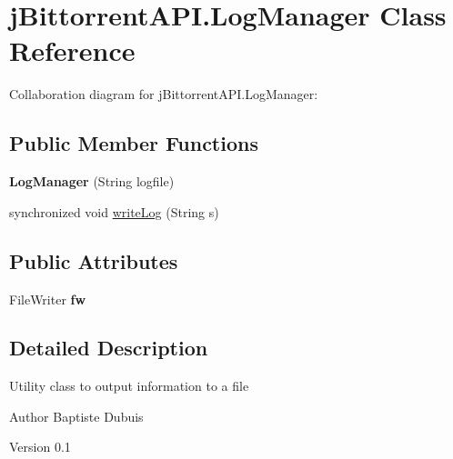 \hypertarget{classj_bittorrent_a_p_i_1_1_log_manager}{
\section{jBittorrentAPI.LogManager Class Reference}
\label{classj_bittorrent_a_p_i_1_1_log_manager}
}
Collaboration diagram for jBittorrentAPI.LogManager:\subsection*{Public Member Functions}
\begin{DoxyCompactItemize}
\item 
\hypertarget{classj_bittorrent_a_p_i_1_1_log_manager_a6eea71c19c7eacaa11692f23ed624428}{
{\bfseries LogManager} (String logfile)}
\label{classj_bittorrent_a_p_i_1_1_log_manager_a6eea71c19c7eacaa11692f23ed624428}

\item 
synchronized void \hyperlink{classj_bittorrent_a_p_i_1_1_log_manager_a09fe8776d05efb0fecc1dba36117e406}{writeLog} (String s)
\end{DoxyCompactItemize}
\subsection*{Public Attributes}
\begin{DoxyCompactItemize}
\item 
\hypertarget{classj_bittorrent_a_p_i_1_1_log_manager_a36be5fc5911232bb76df97d45ae9c40d}{
FileWriter {\bfseries fw}}
\label{classj_bittorrent_a_p_i_1_1_log_manager_a36be5fc5911232bb76df97d45ae9c40d}

\end{DoxyCompactItemize}


\subsection{Detailed Description}
Utility class to output information to a file

\begin{DoxyAuthor}{Author}
Baptiste Dubuis 
\end{DoxyAuthor}
\begin{DoxyVersion}{Version}
0.1 
\end{DoxyVersion}


